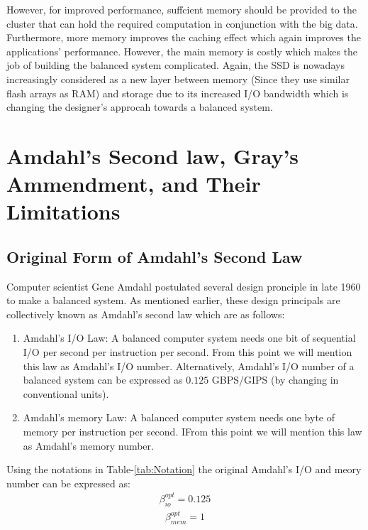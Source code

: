 \documentclass[journal]{IEEEtran}
\begin{document}
However, for improved performance, suffcient memory should be provided to the cluster that can hold the required computation in conjunction with the big data. Furthermore, more memory improves the caching effect which again improves the applications’ performance. However, the main memory is costly which makes the job of building the balanced system complicated. Again, the SSD is nowadays increasingly considered as a new layer between memory (Since they use similar flash arrays as RAM) and storage due to its increased I/O bandwidth which is changing the designer’s approcah towards a balanced system. 

\section{Amdahl's Second law, Gray's Ammendment, and Their Limitations} \label{Sec:AmdahlGray}
\subsection{Original Form of Amdahl's Second Law}
Computer scientist Gene Amdahl postulated several design pronciple in late 1960 to make a balanced system. As mentioned earlier, these design principals are collectively known as Amdahl’s second law  which are as follows:
\begin{enumerate}
\item Amdahl’s I/O Law: A balanced computer system needs one bit of sequential I/O per second per instruction per second. From this point we will mention this law as Amdahl’s I/O number. Alternatively, Amdahl's I/O number of a balanced system can be expressed as $0.125$ GBPS/GIPS (by changing in conventional units).
\item Amdahl’s memory Law: A balanced computer system needs one byte of memory per instruction per second. IFrom this point we will mention this law as Amdahl’s memory number.
\end{enumerate}
Using the notations in Table-\ref{tab:Notation} the original  Amdahl's I/O and meory number can be expressed as:
\begin{equation} \label{eqn:AmdahlIONotation}
\begin{split}
\beta_{io} ^{opt}= 0.125
\end{split}
\end{equation}
\begin{equation} \label{eqn:AmdahlMemNotation}
\begin{split}
\beta_{mem}^{opt} = 1
\end{split}
\end{equation}
\end{document}
